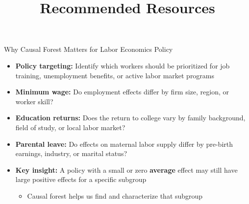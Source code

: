 \documentclass[hyperref={pdfpagelabels=false}]{beamer}
\begin{document}
\begin{frame}{Why Causal Forest Matters for Labor Economics Policy}
	\begin{itemize}
		\item \textbf{Policy targeting:} Identify which workers should be prioritized for job training, unemployment benefits, or active labor market programs
		\vspace{0.3cm}
		\item \textbf{Minimum wage:} Do employment effects differ by firm size, region, or worker skill?
		\vspace{0.3cm}
		\item \textbf{Education returns:} Does the return to college vary by family background, field of study, or local labor market?
		\vspace{0.3cm}
		\item \textbf{Parental leave:} Do effects on maternal labor supply differ by pre-birth earnings, industry, or marital status?
		\vspace{0.3cm}
		\item \textbf{Key insight:} A policy with a small or zero \textbf{average} effect may still have large positive effects for a specific subgroup
		\vspace{0.2cm}
		\begin{itemize}
			\item Causal forest helps us find and characterize that subgroup
		\end{itemize}
	\end{itemize}
\end{frame}




\title[]
{Recommended Resources}

\author{}
\institute{}
\date{}

\begin{frame}{}
	\titlepage
\end{frame}
\end{document}
